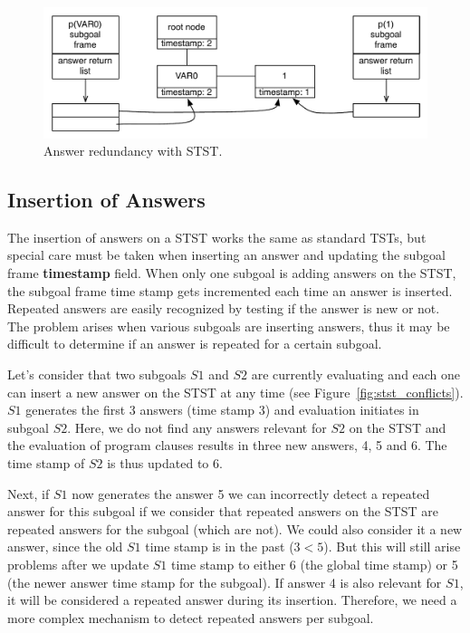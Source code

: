 \begin{figure}[ht]
  \centering
    \includegraphics[scale=0.6]{stst_redundant.pdf}
  \caption{Answer redundancy with STST.}
  \label{fig:stst_redundant}
\end{figure}

\subsection{Insertion of Answers}

The insertion of answers on a STST works the same as standard TSTs, but special care
must be taken when inserting an answer and updating the subgoal frame \textbf{timestamp}
field.
When only one subgoal is adding answers on the STST, the subgoal frame time stamp
gets incremented each time an answer is inserted. Repeated answers are easily recognized
by testing if the answer is new or not.
The problem arises when various subgoals are inserting answers, thus it may be difficult
to determine if an answer is repeated for a certain subgoal.

Let's consider that two subgoals $S1$ and $S2$ are currently
evaluating and each one can insert a new answer on the STST at any time (see
Figure~\ref{fig:stst_conflicts}). $S1$ generates the first 3 answers (time stamp 3)
and evaluation initiates in subgoal $S2$. Here, we do not find any answers relevant
for $S2$ on the STST and the evaluation of program clauses results in three new answers,
4, 5 and 6. The time stamp of $S2$ is thus updated to 6.

Next, if $S1$ now generates the answer 5 we can incorrectly detect a repeated answer
for this subgoal if we consider that repeated answers on the STST are repeated answers for the
subgoal (which are not). We could also consider it a new answer, since the old $S1$ time stamp
is in the past ($3 < 5$). But this will still arise problems after we update $S1$ time stamp
to either 6 (the global time stamp) or 5 (the newer answer time stamp for the subgoal).
If answer 4 is also relevant for $S1$, it will be considered a repeated answer
during its insertion. Therefore, we need a more complex mechanism to
detect repeated answers per subgoal.

